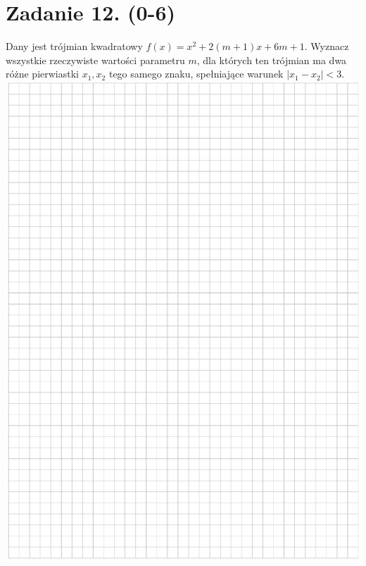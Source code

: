 \documentclass[10pt]{article}
\begin{document}
\section*{Zadanie 12. (0-6)}
Dany jest trójmian kwadratowy \(f(x)=x^{2}+2(m+1) x+6 m+1\). Wyznacz wszystkie rzeczywiste wartości parametru \(m\), dla których ten trójmian ma dwa różne pierwiastki \(x_{1}, x_{2}\) tego samego znaku, spełniające warunek \(\left|x_{1}-x_{2}\right|<3\).\\
\includegraphics[max width=\textwidth, center]{2024_11_21_054c332d5c02f869c372g-12}\\
\end{document}
